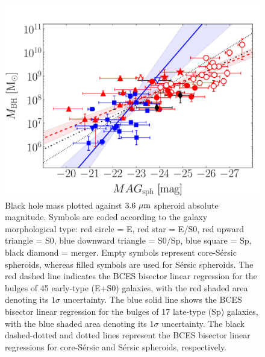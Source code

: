 \documentclass[preprint2]{emulateapj}
\begin{document}
\begin{figure}[h]
\begin{center}
\includegraphics[width=\columnwidth]{images/mbh_vs_mag_sph.pdf}
\caption{Black hole mass plotted against $3.6\rm~\mu m$ spheroid absolute magnitude. 
Symbols are coded according to the galaxy morphological type: red circle = E, red star = E/S0, 
red upward triangle = S0, blue downward triangle = S0/Sp, blue square = Sp, black diamond = merger. 
Empty symbols represent core-S\'ersic spheroids, whereas filled symbols are used for S\'ersic spheroids. 
The red dashed line indicates the BCES bisector linear regression for the bulges of 45 early-type (E+S0) galaxies, 
with the red shaded area denoting its $1\sigma$ uncertainty. 
The blue solid line shows the BCES bisector linear regression for the bulges of 17 late-type (Sp) galaxies, 
with the blue shaded area denoting its $1\sigma$ uncertainty. 
The black dashed-dotted and dotted lines represent the BCES bisector linear regressions for core-S\'ersic and S\'ersic spheroids, respectively.}
\label{fig:mbhmagsph}
\end{center}
\end{figure}
\end{document}
